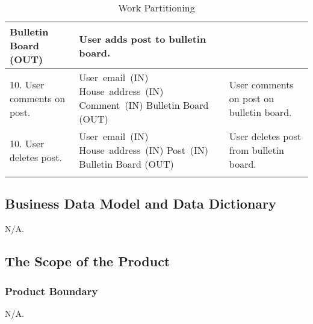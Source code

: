 \documentclass[12pt]{article}
\begin{document}
\begin{longtable}{|p{5cm}|p{5cm}|p{5cm}|}
Bulletin Board (OUT) & User adds post to bulletin board. \\
\hline
10. User comments on post. & \mbox{User email (IN)} \linebreak \mbox{House address (IN)} \linebreak\mbox{Comment (IN)} 
\linebreak Bulletin Board (OUT) & User comments on post on bulletin board. 
\\
\hline
10. User deletes post. & \mbox{User email (IN)} \linebreak \mbox{House address (IN)} \linebreak\mbox{Post (IN)} \linebreak 
Bulletin Board (OUT) & User deletes post from bulletin board. \\
\hline

\caption{Work Partitioning}
\label{tab:workpartition}
\end{longtable}
	
\subsection{Business Data Model and Data Dictionary}
N/A.

\subsection{The Scope of the Product}
\subsubsection{Product Boundary}
N/A.
\end{document}
